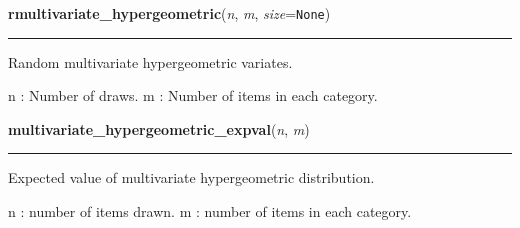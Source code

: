     \label{pymc:distributions:rmultivariate_hypergeometric}

    \vspace{0.5ex}

    \begin{boxedminipage}{\textwidth}

    \raggedright \textbf{rmultivariate\_hypergeometric}(\textit{n}, \textit{m}, \textit{size}=\texttt{None})

    \vspace{-1.5ex}

    \rule{\textwidth}{0.5\fboxrule}

Random multivariate hypergeometric variates.

n : Number of draws.
m : Number of items in each category.
    \vspace{1ex}

    \end{boxedminipage}

    \label{pymc:distributions:multivariate_hypergeometric_expval}

    \vspace{0.5ex}

    \begin{boxedminipage}{\textwidth}

    \raggedright \textbf{multivariate\_hypergeometric\_expval}(\textit{n}, \textit{m})

    \vspace{-1.5ex}

    \rule{\textwidth}{0.5\fboxrule}

Expected value of multivariate hypergeometric distribution.

n : number of items drawn.
m : number of items in each category.
    \vspace{1ex}

    \end{boxedminipage}

    \label{pymc:distributions:multivariate_hypergeometric_like}

    \vspace{0.5ex}


